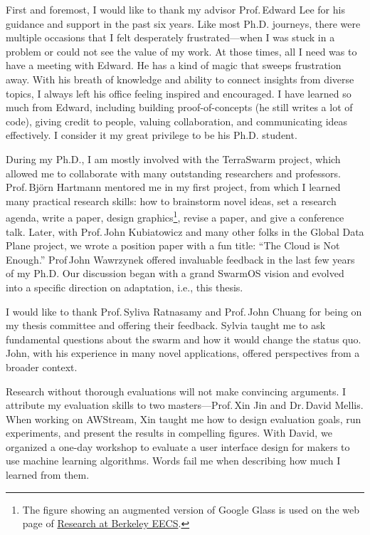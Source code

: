 \documentclass[thesis.tex]{subfiles}
\begin{document}
\begin{acknowledgements}

  First and foremost, I would like to thank my advisor Prof.\,Edward Lee for his
  guidance and support in the past six years. Like most Ph.D. journeys, there
  were multiple occasions that I felt desperately frustrated---when I was stuck
  in a problem or could not see the value of my work. At those times, all I need
  was to have a meeting with Edward. He has a kind of magic that sweeps
  frustration away. With his breath of knowledge and ability to connect insights
  from diverse topics, I always left his office feeling inspired and
  encouraged. I have learned so much from Edward, including building
  proof-of-concepts (he still writes a lot of code), giving credit to people,
  valuing collaboration, and communicating ideas effectively. I consider it my
  great privilege to be his Ph.D. student.

  During my Ph.D., I am mostly involved with the TerraSwarm project, which
  allowed me to collaborate with many outstanding researchers and
  professors. Prof.\,Bj\"orn Hartmann mentored me in my first project, from
  which I learned many practical research skills: how to brainstorm novel ideas,
  set a research agenda, write a paper, design graphics\footnote{The figure
    showing an augmented version of Google Glass is used on the web page of
    \href{https://eecs.berkeley.edu/research}{Research at Berkeley EECS}.},
  revise a paper, and give a conference talk. Later, with Prof.\,John
  Kubiatowicz and many other folks in the Global Data Plane project, we wrote a
  position paper with a fun title: ``The Cloud is Not Enough.''  Prof\,John
  Wawrzynek offered invaluable feedback in the last few years of my Ph.D. Our
  discussion began with a grand SwarmOS vision and evolved into a specific
  direction on adaptation, i.e., this thesis.

  I would like to thank Prof.\,Syliva Ratnasamy and Prof.\,John Chuang for being
  on my thesis committee and offering their feedback. Sylvia taught me to ask
  fundamental questions about the swarm and how it would change the status
  quo. John, with his experience in many novel applications, offered
  perspectives from a broader context.

  Research without thorough evaluations will not make convincing arguments. I
  attribute my evaluation skills to two masters---Prof.\,Xin Jin and Dr.\,David
  Mellis. When working on AWStream, Xin taught me how to design evaluation
  goals, run experiments, and present the results in compelling figures. With
  David, we organized a one-day workshop to evaluate a user interface design for
  makers to use machine learning algorithms. Words fail me when describing how
  much I learned from them.


\end{acknowledgements}
\end{document}
